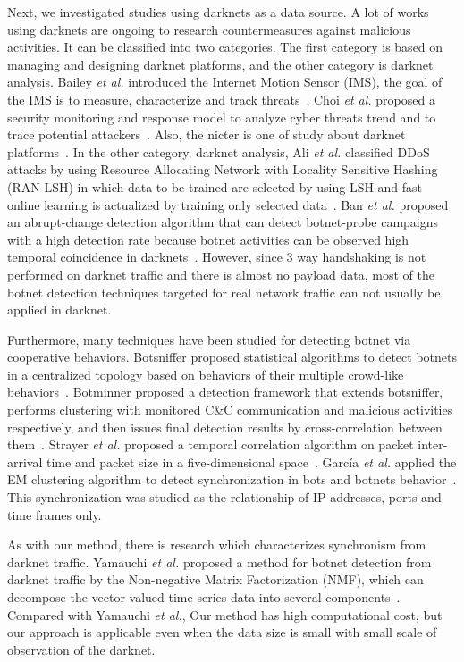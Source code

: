 \documentclass{sig-alternate-10pt}
\begin{document}
Next, we investigated studies using darknets as a data source.
A lot of works using darknets are ongoing to research countermeasures against malicious activities.
It can be classified into two categories.
The first category is based on managing and designing darknet platforms, and the other category is darknet analysis.
Bailey {\it et al.} introduced the Internet Motion Sensor (IMS), the goal of the IMS is to measure, characterize and track threats~\cite{Bailey, Bailey2}.
Choi {\it et al.} proposed a security monitoring and response model to analyze cyber threats trend and to trace potential attackers~\cite{Choi}.
Also, the nicter is one of study about darknet platforms~\cite{Nakao}.
In the other category, darknet analysis, Ali {\it et al.} classified DDoS attacks by using Resource Allocating Network with Locality Sensitive Hashing (RAN-LSH) in which data to be trained are selected by using LSH and fast online learning is actualized by training only selected data~\cite{Ali}.
Ban {\it et al.} proposed an abrupt-change detection algorithm that can detect botnet-probe campaigns with a high detection rate because botnet activities can be observed high temporal coincidence in darknets~\cite{Ban}.
However, since 3 way handshaking is not performed on darknet traffic and there is almost no payload data, most of the botnet detection techniques targeted for real network traffic can not usually be applied in darknet.

Furthermore, many techniques have been studied for detecting botnet via cooperative behaviors.
Botsniffer proposed statistical algorithms to detect botnets in a centralized topology based on behaviors of their multiple crowd-like behaviors~\cite{Gu}.
Botminner proposed a detection framework that extends botsniffer, performs clustering with monitored C\&C communication and malicious activities respectively, and then issues final detection results by cross-correlation between them~\cite{Gu2}.
Strayer {\it et al.} proposed a temporal correlation algorithm on packet inter-arrival time and packet size in a five-dimensional space~\cite{Strayer}.
Garc\'{i}a {\it et al.} applied the EM clustering algorithm to detect synchronization in bots and botnets behavior~\cite{Garcia2}. This synchronization was studied as the relationship of IP addresses, ports and time frames only.

As with our method, there is research which characterizes synchronism from darknet traffic.
Yamauchi {\it et al.} proposed a method for botnet detection from darknet traffic by the Non-negative Matrix Factorization (NMF), which can decompose the vector valued time series data into several components~\cite{Yamauchi}.
Compared with Yamauchi {\it et al.}, Our method has high computational cost, but our approach is applicable even when the data size is small with small scale of observation of the darknet.
\end{document}
